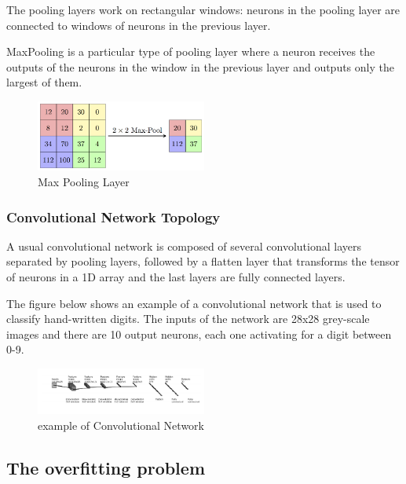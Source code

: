 \documentclass[a4paper,10pt]{article}
\begin{document}
\begin{itemize}
 		\quad The pooling layers work on rectangular windows: neurons in the pooling layer are connected to windows of neurons in the
 		previous layer. 
 		
 	 	\quad MaxPooling is a particular type of pooling layer where a neuron receives the outputs of the neurons in the window in the previous layer and outputs only the largest of them.  
 		
 		
 		\begin{figure}[!htbp]
 			\centering
 			\includegraphics[width=0.5\textwidth]{maxpool.png}
 			\caption{Max Pooling Layer}
 		\end{figure}
 
 	\end{itemize}
 	\vspace{5mm} %
 
 \subsubsection{Convolutional Network Topology}
 
 \quad A usual convolutional network is composed of several convolutional layers separated by pooling layers, followed by a flatten layer that transforms the tensor of neurons in a 1D array and the last layers are fully connected layers. 
 
 \quad The figure below shows an example of a convolutional network that is used to classify hand-written digits. The inputs of the network are 28x28 grey-scale images and there are 10 output neurons, each one activating for a digit between 0-9. 
  
 	\begin{figure}[!htbp]
 	\centering
 	\includegraphics[width=0.5\textwidth]{convnetTopo.png}
 	\caption{example of Convolutional Network}
 \end{figure}
 
 
 \subsection{The overfitting problem}
\end{document}
